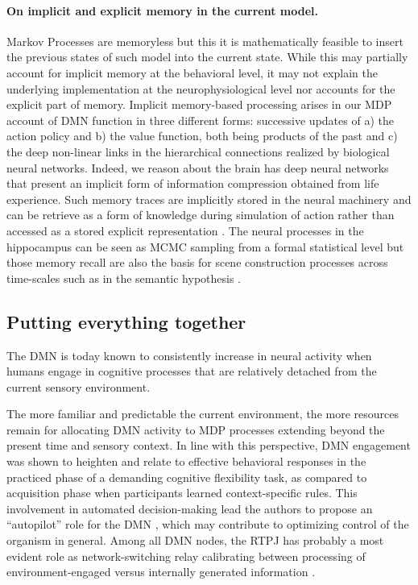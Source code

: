 \documentclass[10pt,letterpaper]{article}
\begin{document}
\paragraph*{On implicit and explicit memory in the current model.}
Markov Processes are memoryless but this it is mathematically feasible to insert the previous states of such model into the current state. While this may partially account for implicit memory at the behavioral level, it may not explain the underlying implementation at the neurophysiological level nor accounts for the explicit part of memory. Implicit memory-based processing arises in our MDP account of DMN function in three different forms: successive updates of a) the action policy and b) the value function, both being products of the past and c) the deep non-linear links in the hierarchical connections realized by biological neural networks. Indeed, we reason about the brain has deep neural networks that present an implicit form of information compression obtained from life experience. Such memory traces are implicitly stored in the neural machinery and can be retrieve as a form of knowledge during simulation of action rather than accessed as a stored explicit representation \citep{pezzulo2011grounding}. The neural processes in the hippocampus can be seen as MCMC sampling from a formal statistical level but those memory recall are also the basis for scene construction processes across time-scales such as in the semantic hypothesis \citep{schacter2007remembering,Axelrod2017}.

\subsection{Putting everything together}
The DMN is today known to consistently increase in neural
activity when humans engage in cognitive processes that are relatively detached from
the current sensory environment.

The more familiar and predictable the current environment, the more resources remain for allocating DMN activity to MDP processes extending beyond the present time and sensory context. In line with this perspective, DMN engagement was shown to heighten and relate to effective behavioral responses in the practiced phase of a demanding cognitive flexibility task, as compared to acquisition phase when participants learned context-specific rules. This involvement in automated decision-making lead the authors to propose an ``autopilot'' role for the DMN \citep{vatansever2017pnas}, which may contribute to optimizing control of the organism in general. Among all DMN nodes, the RTPJ has probably a most evident role as network-switching relay calibrating between processing of environment-engaged versus internally generated information \citep{downar2000multimodal, golland2006extrinsic, bzdok2013tpj}.
\end{document}
